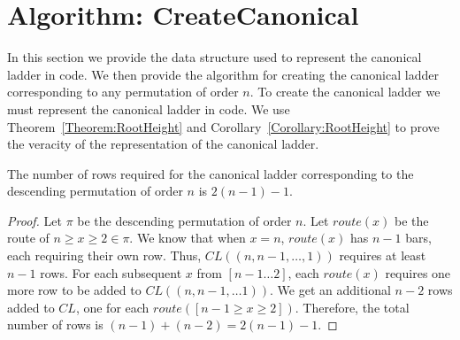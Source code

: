

\section{Algorithm: {\sc CreateCanonical}}
In this section we provide the data structure used to represent the canonical ladder in code. We then provide the algorithm for creating the canonical ladder corresponding to any permutation of 
order $n$. 
To create the canonical ladder 
we must represent the canonical ladder in code. We use Theorem~\ref{Theorem:RootHeight} and Corollary~\ref{Corollary:RootHeight} to prove the 
veracity of the representation of the canonical ladder.
 \begin{theorem}
   The number of rows required for the canonical ladder corresponding to the descending permutation of order $n$ is $2(n-1) - 1$.
   \label{Theorem:RootHeight}
 \end{theorem}
 \begin{proof}
 	Let $\pi$ be the descending permutation of order $n$. Let $route(x)$ be the route of $n \geq x \geq 2 \in \pi$. We know that 
     when $x=n$, $route(x)$ has $n-1$ bars, each requiring their own row. Thus, $CL((n,n-1, \dots, 1))$ requires at least $n-1$ rows. 
     For each subsequent $x$ from $[n-1 \dots 2]$, each $route(x)$ requires one more row to be added to $CL((n, n-1, \dots 1))$. 
     We get an additional $n-2$ rows added to $CL$, one for each $route([n-1 \geq x \geq 2])$. Therefore, the total number of rows is 
     $(n-1)+(n-2)=2(n-1)-1$.
 \end{proof}

